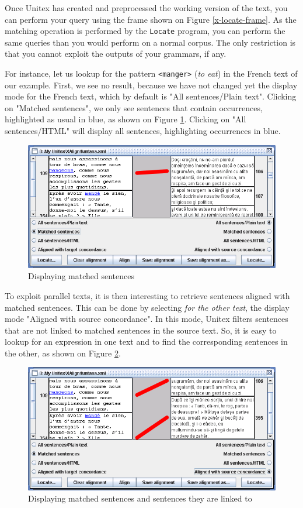\bigskip
\noindent Once Unitex has created and preprocessed the working version of the
text, you can perform your query using the frame shown on Figure
\ref{x-locate-frame}. As the matching operation is performed by the
\verb+Locate+ program, you can perform the same queries
than you would perform on a normal corpus. The only restriction is that you
cannot exploit the outputs of your grammars, if any.

\bigskip
\noindent For instance, let us lookup for the pattern \verb+<manger>+ 
(\textit {to eat}) in the French text of our example. First, we see no result,
because we have not changed yet the display mode for the French text, which 
by default is "All sentences/Plain text". Clicking on "Matched sentences", 
we only see sentences that contain occurrences, highlighted as usual in blue,
as shown on Figure \ref{x-concord}. Clicking on "All sentences/HTML" will
display all sentences, highlighting occurrences in blue. 

\begin{figure}[!ht]
\begin{center}
\includegraphics[width=15.5cm]{resources/img/figX-8.png}
\caption{Displaying matched sentences\label{x-concord}}
\end{center}
\end{figure}

\bigskip
\noindent To exploit parallel texts, it is then interesting to retrieve
sentences aligned with matched sentences. This can be done by selecting
\textit{for the other text}, the display mode "Aligned with source
concordance". In this mode, Unitex filters sentences that are not linked
to matched sentences in the source text. So, it is easy to lookup for an
expression in one text and to find the corresponding sentences in the other,
as shown on Figure \ref{x-concord-aligned}.

\begin{figure}[!ht]
\begin{center}
\includegraphics[width=15.5cm]{resources/img/figX-9.png}
\caption{Displaying matched sentences and sentences
they are linked to\label{x-concord-aligned}}
\end{center}
\end{figure}
